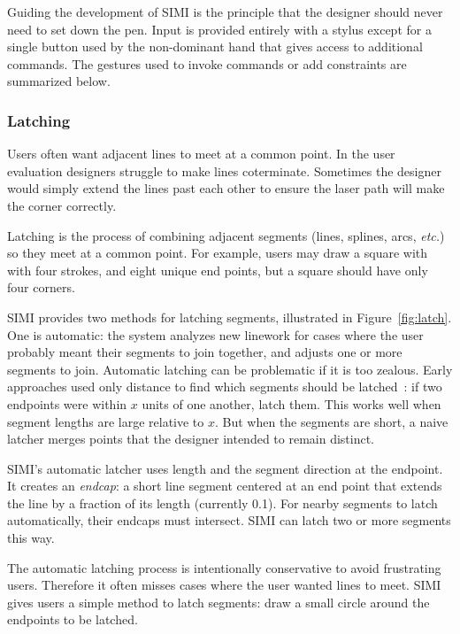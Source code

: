 \documentclass{article}
\begin{document}

Guiding the development of SIMI is the principle that the designer
should never need to set down the pen. Input is provided entirely with
a stylus except for a single button used by the non-dominant hand that
gives access to additional commands. The gestures used to invoke
commands or add constraints are summarized below.

\subsubsection{Latching}

Users often want adjacent lines to meet at a common point. In the user
evaluation designers struggle to make lines coterminate. Sometimes the
designer would simply extend the lines past each other to ensure the
laser path will make the corner correctly. 

Latching is the process of combining adjacent segments (lines,
splines, arcs, \textit{etc.}) so they meet at a common point. For
example, users may draw a square with with four strokes, and eight
unique end points, but a square should have only four corners.

SIMI provides two methods for latching segments, illustrated in
Figure~\ref{fig:latch}. One is automatic: the system analyzes new
linework for cases where the user probably meant their segments to
join together, and adjusts one or more segments to join. Automatic
latching can be problematic if it is too zealous. Early approaches
used only distance to find which segments should be
latched~\cite{herot-latch-corners}: if two endpoints were within $x$
units of one another, latch them. This works well when segment lengths
are large relative to $x$. But when the segments are short, a naive
latcher merges points that the designer intended to remain distinct.

SIMI's automatic latcher uses length and the segment direction at the
endpoint. It creates an \textit{endcap}: a short line segment centered
at an end point that extends the line by a fraction of its length
(currently 0.1). For nearby segments to latch automatically, their
endcaps must intersect. SIMI can latch two or more segments this way.

The automatic latching process is intentionally conservative to avoid
frustrating users. Therefore it often misses cases where the user
wanted lines to meet. SIMI gives users a simple method to latch
segments: draw a small circle around the endpoints to be latched.
\end{document}
